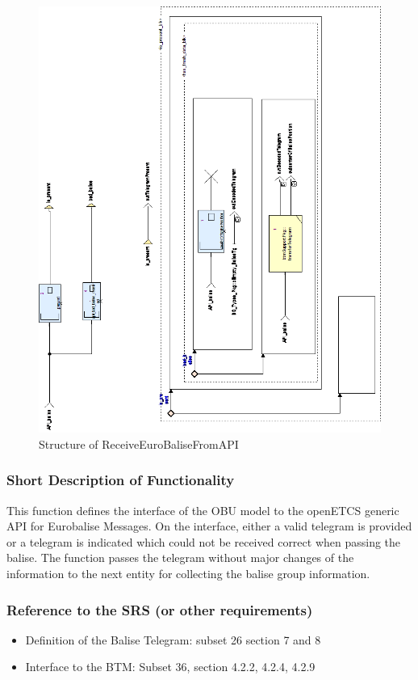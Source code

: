 \documentclass{template/openetcs_report}
\begin{document}
\begin{figure}[hbtp]
\centering
\includegraphics[width=.9\textwidth]{../images/ReceiveEuroBaliseFromAPI_diagram.png}
\caption{Structure of ReceiveEuroBaliseFromAPI}
\end{figure}

\subsubsection{Short Description of Functionality}
This function defines the interface of the OBU model to the openETCS generic API for Eurobalise Messages. On the interface, either a valid telegram is provided or a telegram is indicated which could not be received correct when passing the balise. The function passes the telegram without major changes of the information to the next entity for collecting the balise group information.
	
\subsubsection{Reference to the SRS (or other requirements)}
\begin{itemize}
\item Definition of the Balise Telegram: subset 26 section 7 and 8
\item Interface to the BTM: Subset 36, section  4.2.2, 4.2.4, 4.2.9
\end{itemize}
\end{document}
